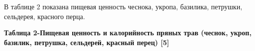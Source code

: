 В таблице 2 показана пищевая ценность чеснока, укропа, базилика,
петрушки, сельдерея, красного перца.

{\bfseries Таблица 2-Пищевая ценность и калорийность пряных трав (чеснок,
укроп, базилик, петрушка, сельдерей, красный перец) {[}5{]}}

